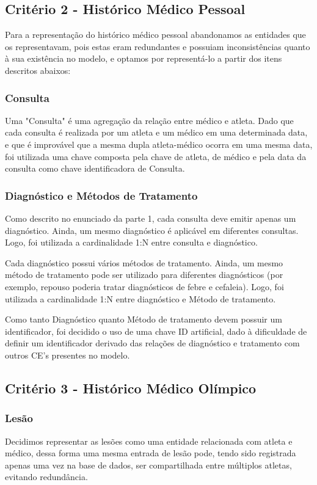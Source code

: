 \documentclass[12pt,a4paper]{article}
\begin{document}
\subsection{Critério 2 - Histórico Médico Pessoal}
    Para a representação do histórico médico pessoal abandonamos as entidades que os representavam, pois estas eram redundantes e possuiam inconsistências quanto à sua existência no modelo, e optamos por representá-lo a partir dos itens descritos abaixos:

\subsubsection{Consulta}
    Uma "Consulta" é uma agregação da relação entre médico e atleta. Dado que cada consulta é realizada por um atleta e um médico em uma determinada data, e que é improvável que a mesma dupla atleta-médico ocorra em uma mesma data, foi utilizada uma chave composta pela chave de atleta, de médico e pela data da consulta como chave identificadora de Consulta.

\subsubsection{Diagnóstico e Métodos de Tratamento}
    Como descrito no enunciado da parte 1, cada consulta deve emitir apenas um diagnóstico. Ainda, um mesmo diagnóstico é aplicável em diferentes consultas. Logo, foi utilizada a cardinalidade 1:N entre consulta e diagnóstico. \par 
    Cada diagnóstico possui vários métodos de tratamento. Ainda, um mesmo método de tratamento pode ser utilizado para diferentes diagnósticos (por exemplo, repouso poderia tratar diagnósticos de febre e cefaleia). Logo, foi utilizada a cardinalidade 1:N entre diagnóstico e Método de tratamento. \par
    Como tanto Diagnóstico quanto Método de tratamento devem possuir um identificador, foi decidido o uso de uma chave ID artificial, dado à dificuldade de definir um identificador derivado das relações de diagnóstico e tratamento com outros CE's presentes no modelo.

\subsection{Critério 3 - Histórico Médico Olímpico}
\subsubsection{Lesão}
    Decidimos representar as lesões como uma entidade relacionada com atleta e médico, dessa forma uma mesma entrada de lesão pode, tendo sido registrada apenas uma vez na base de dados, ser compartilhada entre múltiplos atletas, evitando redundância.
\end{document}
